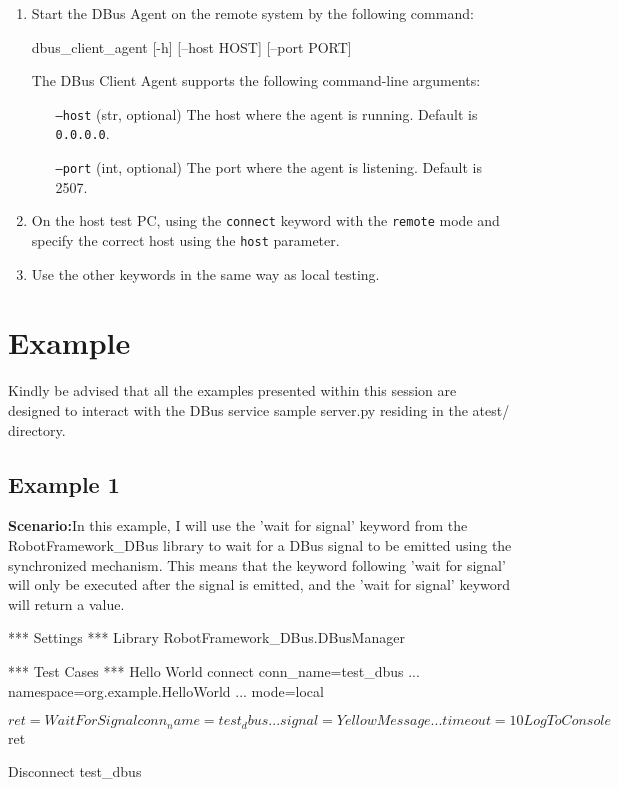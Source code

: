 \begin{enumerate}
    \item Start the DBus Agent on the remote system by the following command:
	
		dbus\_client\_agent [-h] [--host HOST] [--port PORT]
		
		The DBus Client Agent supports the following command-line arguments:

		\begin{itemize}
			\setlength{\itemindent}{10em}
			\item [\texttt{--host} (str, optional)] The host where the agent is running. Default is \texttt{0.0.0.0}.
			\item [\texttt{--port} (int, optional)] The port where the agent is listening. Default is 2507.
		\end{itemize}

	
    \item On the host test PC, using the \texttt{connect} keyword with the \texttt{remote} mode and specify the correct host using the \texttt{host} parameter.
    \item Use the other keywords in the same way as local testing.
\end{enumerate}


\hypertarget{example}{%
\section{Example}\label{example}}


Kindly be advised that all the examples presented within this session are designed to interact with the DBus service sample server.py residing in the atest/ directory.

\hypertarget{description-example1}{%
\subsection{\texorpdfstring{\textbf{Example 1}}{Example 1}}\label{description-example1}}

\textbf{Scenario:}In this example, I will use the 'wait for signal' keyword from the RobotFramework\_DBus library to wait for a DBus signal to be emitted using the synchronized mechanism. 
This means that the keyword following 'wait for signal' will only be executed after the signal is emitted, and the 'wait for signal' keyword will return a value.


\begin{robotcode}
*** Settings ***
Library    RobotFramework_DBus.DBusManager
 
*** Test Cases ***
Hello World
   connect    conn_name=test_dbus    
   ...        namespace=org.example.HelloWorld
   ...        mode=local

   ${ret}=    Wait For Signal     conn_name=test_dbus
   ...                            signal=YellowMessage    
   ...                            timeout=10  
   
   Log To Console    ${ret}
   
   Disconnect    test_dbus
\end{robotcode}

